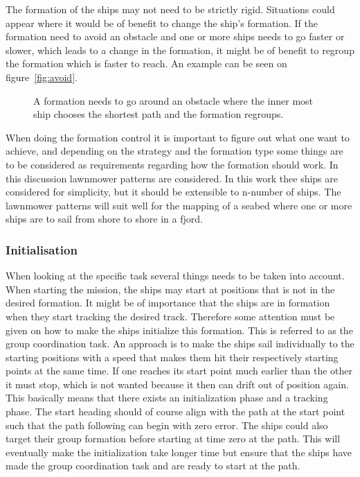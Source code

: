The formation of the ships may not need to be strictly rigid. Situations could appear where it would be of benefit to change the ship's formation. If the formation need to avoid an obstacle and one or more ships needs to go faster or slower, which leads to a change in the formation, it might be of benefit to regroup the formation which is faster to reach. An example can be seen on figure~\vref{fig:avoid}.

\begin{figure}[htbp]
	\centering
	
	\caption{A formation needs to go around an obstacle where the inner most ship chooses the shortest path and the formation regroups.}
	\label{fig:avoid}
\end{figure}

When doing the formation control it is important to figure out what one
want to achieve, and depending on the strategy and the formation type
some things are to be considered as requirements regarding how the
formation should work. In this discussion lawnmower patterns are considered. In this work thee ships are considered for simplicity, but it should be extensible to n-number of ships. The lawnmower patterns will suit well for the mapping of a seabed where one or more ships are to sail from shore to shore in a fjord.

\subsubsection{Initialisation}
When looking at the specific task several things needs to be taken into account. When starting the mission, the ships may start at positions that is not in the desired formation. It might be of importance that the ships are in
formation when they start tracking the desired track. Therefore some
attention must be given on how to make the ships initialize this
formation. This is referred to as the group coordination task. An approach is to make the ships sail individually to the
starting positions with a speed that makes them hit their respectively starting points at
the same time. If one reaches its start point much earlier
than the other it must stop, which is not wanted because it then can
drift out of position again. This basically means that there exists an initialization
phase and a tracking phase. The start heading should of
course align with the path at the start point such that the path following can begin with zero error. The ships could also target their group formation before starting at time zero at the path. This will eventually make the initialization take longer time but ensure that the ships have made the group coordination task and are ready to start at the path.

